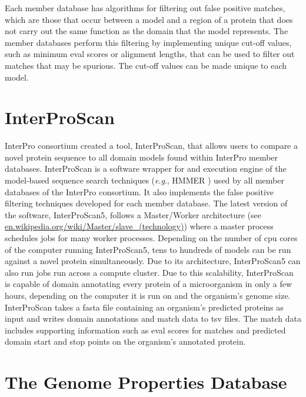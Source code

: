 Each member database has algorithms for filtering out false positive matches, 
which are those that occur between a model and a region of a protein that does 
not carry out the same function as the domain that the model represents. The 
member databases perform this filtering by implementing unique cut-off values, 
such as minimum \gls{eval} scores or alignment lengths, that can be used to 
filter out matches that may be spurious. The cut-off values can be made unique 
to each model. 

\section{InterProScan} \label{overview-interproscan}

InterPro consortium created a tool, InterProScan, that allows users to compare a 
novel protein sequence to all domain models found within InterPro member 
databases. InterProScan is a software wrapper for and execution engine of the 
model-based sequence search techniques (\textit{e}.\textit{g}., HMMER \cite{eddy2011accelerated}) 
used by all member databases of the InterPro consortium. It also implements the 
false positive filtering techniques developed for each member database. The 
latest version of the software, InterProScan5, follows a Master/Worker 
architecture (see 
\href{http://en.wikipedia.org/wiki/Master/slave_(technology)}{en.wikipedia.org/wiki/Master/slave\_(technology)}) 
where a master process schedules jobs for many worker processes. Depending on 
the number of \gls{cpu} cores of the computer running InterProScan5, tens to 
hundreds of models can be run against a novel protein simultaneously. Due to its 
architecture, InterProScan5 can also run jobs run across a compute cluster. Due 
to this scalability, InterProScan is capable of domain annotating every protein 
of a microorganism in only a few hours, depending on the computer it is run on 
and the organism's genome size. InterProScan takes a \gls{fasta} file 
\cite{pearson19905} containing an organism's predicted proteins as input and 
writes domain annotations and match data to \gls{tsv} files. The match data 
includes supporting information such as \gls{eval} scores for matches and 
predicted domain start and stop points on the organism's annotated protein.

\section{The Genome Properties Database} \label{genome-properties-overview}

